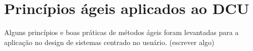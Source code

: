 






\section{Princípios ágeis aplicados ao DCU}

	Alguns princípios e boas práticas de métodos ágeis foram levantadas para a aplicação no design de sistemas centrado no usuário. (escrever algo)

